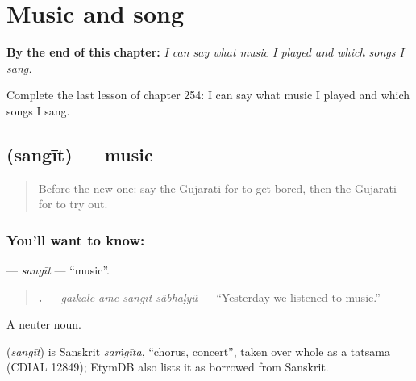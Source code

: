 
\chapter{Music and song}
\label{ch:gu-music-and-song}

\begin{chapteropening}
\textbf{By the end of this chapter:} \emph{I can say what music I played and which songs I sang.}

Complete the last lesson of chapter 254: I can say what music I played and which songs I sang.
\end{chapteropening}

\section[\texorpdfstring{\gu{સંગીત} (sangīt)}{સંગીત (sangīt)}]{ (sangīt) — music}

\label{lesson:GU-C254-sangit}



\begin{quote}
Before the new one: say the Gujarati for to get bored, then the Gujarati for to try out.
\end{quote}

\subsection*{You'll want to know: }
\textbf{} — \emph{sangīt} — \textquotedblleft{}music\textquotedblright{}.

\begin{quote}
\textbf{   .} — \emph{gaīkāle ame sangīt sā̃bhaḷyũ} — \textquotedblleft{}Yesterday we listened to music.\textquotedblright{}
\end{quote}

A neuter noun.

\begin{cousinweb}
\textbf{} (\emph{sangīt}) is Sanskrit \emph{saṁgīta}, \textquotedblleft{}chorus, concert\textquotedblright{}, taken over whole as a tatsama (CDIAL 12849); EtymDB also lists it as borrowed from Sanskrit.
\end{cousinweb}

